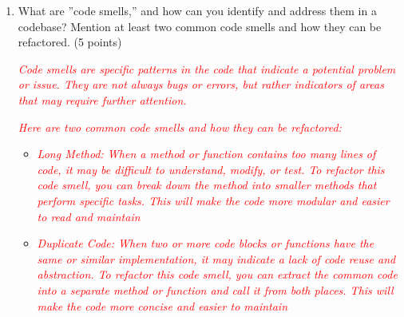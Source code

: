\documentclass{article}
\begin{document}
\begin{enumerate}
             \item What are ”code smells,” and how can you identify and address them in
             a codebase? Mention at least two common code smells and how they can
             be refactored. (5 points)\par
             \textcolor{red}{\textit{Code smells are specific patterns in the code that indicate a potential problem or issue. 
             They are not always bugs or errors, but rather indicators of areas that may require further attention.}}\par
             \textcolor{red}{\textit{Here are two common code smells and how they can be refactored:}}
             \begin{itemize}
                \item \textcolor{red}{\textit{Long Method: When a method or function contains too many lines of code, 
                it may be difficult to understand, modify, or test. To refactor this code smell, you can break down 
                the method into smaller methods that perform specific tasks. This will make the code more modular and easier to read and maintain}}
                \item \textcolor{red}{\textit{Duplicate Code: When two or more code blocks or functions have the same or similar implementation,
                 it may indicate a lack of code reuse and abstraction. To refactor this code smell,
                  you can extract the common code into a separate method or function and call it from both places. 
                  This will make the code more concise and easier to maintain}}
             \end{itemize}


\end{enumerate}
\end{document}

